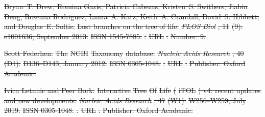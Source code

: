 \documentclass[oupdraft]{sysbio_sse}
\providecommand{\DIFdel}[1]{{\protect\color{red}\sout{#1}}}                      %
\begin{document}
\DIFdel{Bryan~T. Drew, Romina Gazis, Patricia Cabezas, Kristen~S. Swithers, Jiabin
  Deng, Roseana Rodriguez, Laura~A. Katz, Keith~A. Crandall, David~S. Hibbett,
  and Douglas~E. Soltis.
}%
\DIFdel{Lost branches on the tree of life.
}%
\emph{\DIFdel{PLOS Biol}}%
\DIFdel{, 11}%
\DIFdel{(9):}%
\DIFdel{e1001636, September 2013.
}%
\DIFdel{ISSN 1545-7885.
}%
\DIFdel{.
}%
\DIFdel{URL
  }%
\DIFdel{.
}%
\DIFdel{Number: 9.
}%

\DIFdel{Scott Federhen.
}%
\DIFdel{The }%
\DIFdel{NCBI}%
\DIFdel{Taxonomy}%
\DIFdel{database.
}%
\emph{\DIFdel{Nucleic Acids Research}}%
\DIFdel{, 40}%
\DIFdel{(D1):}%
\DIFdel{D136--D143,
  January 2012.
}%
\DIFdel{ISSN 0305-1048.
}%
\DIFdel{.
}%
\DIFdel{URL }%
\DIFdel{.
}%
\DIFdel{Publisher: Oxford Academic.
}%

\DIFdel{Ivica Letunic and Peer Bork.
}%
\DIFdel{Interactive }%
\DIFdel{Tree}%
\DIFdel{Of}%
\DIFdel{Life}%
\DIFdel{(}%
\DIFdel{iTOL}%
\DIFdel{) v4: recent updates and new
  developments.
}%
\emph{\DIFdel{Nucleic Acids Research}}%
\DIFdel{, 47}%
\DIFdel{(W1):}%
\DIFdel{W256--W259,
  July 2019.
}%
\DIFdel{ISSN 0305-1048.
}%
\DIFdel{.
}%
\DIFdel{URL }%
\DIFdel{.
}%
\DIFdel{Publisher: Oxford Academic.
}%
\end{document}
